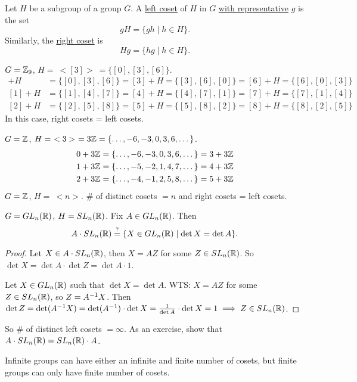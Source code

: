 \documentclass[]{article}
\begin{document}
\begin{definition}
	Let $H$ be a subgroup of a group $G$.
	A \ul{left coset} of $H$ in $G$ \ul{with representative} $g$ is the set $$gH = \{gh\mid h\in H\}.$$
	Similarly, the \ul{right coset} is $$Hg = \{hg\mid h\in H\}.$$
\end{definition}
\begin{example}
	$G = \mathbb{Z}_9$, $H =\ <[3]>\ = \{[0],[3],[6]\}$.
	\begin{align*}
		[0] + H &= \{[0],[3],[6]\} = [3] + H = \{[3],[6],[0]\} = [6] + H = \{[6],[0],[3]\} \\
		[1] + H &= \{[1],[4],[7]\} = [4] + H = \{[4],[7],[1]\} = [7] + H = \{[7],[1],[4]\} \\
		[2] + H &= \{[2],[5],[8]\} = [5] + H = \{[5],[8],[2]\} = [8] + H = \{[8],[2],[5]\}
	\end{align*}
	In this case, right cosets = left cosets.
\end{example}
\begin{example}
	$G = \mathbb{Z}$, $H =\ <3>\ = 3\mathbb{Z} = \{\dots,-6,-3,0,3,6,\dots\}$.
	\begin{align*}
		0 + 3\mathbb{Z} &= \{\dots,-6,-3,0,3,6,\dots\} = 3+3\mathbb{Z} \\
		1 + 3\mathbb{Z} &= \{\dots,-5,-2,1,4,7,\dots\} = 4+3\mathbb{Z} \\
		2 + 3\mathbb{Z} &= \{\dots,-4,-1,2,5,8,\dots\} = 5+3\mathbb{Z}
	\end{align*}
	$G = \mathbb{Z}$, $H =\ <n>$. \# of distinct cosets $=n$ and right cosets = left cosets.
\end{example}
\begin{example}
	$G = GL_n(\mathbb{R})$, $H = SL_n(\mathbb{R})$. Fix $A\in GL_n(\mathbb{R})$.
	Then $$A\cdot SL_n(\mathbb{R}) \overset{?}{=} \{X\in GL_n(\mathbb{R})\mid\det X = \det A\}.$$
	\begin{proof}
		\say{$\subseteq$} Let $X\in A\cdot SL_n(\mathbb{R})$, then $X = AZ$ for some $Z\in SL_n(\mathbb{R})$. So $\det X = \det A \cdot \det Z = \det A\cdot 1$.
		
		\say{$\supseteq$} Let $X\in GL_n(\mathbb{R})$ such that $\det X = \det A$.
		WTS: $X = AZ$ for some $Z\in SL_n(\mathbb{R})$, so $Z = A^{-1} X$.
		Then $\det Z = \det(A^{-1} X) = \det(A^{-1})\cdot \det X = \frac{1}{\det A}\cdot \det X = 1 \implies Z\in SL_n(\mathbb{R})$.
	\end{proof}
	So \# of distinct left cosets $=\infty$. As an exercise, show that $A\cdot SL_n(\mathbb{R}) = SL_n(\mathbb{R}) \cdot A$.
\end{example}
\begin{remark}
	Infinite groups can have either an infinite and finite number of cosets, but finite groups can only have finite number of cosets.
\end{remark}
\end{document}
